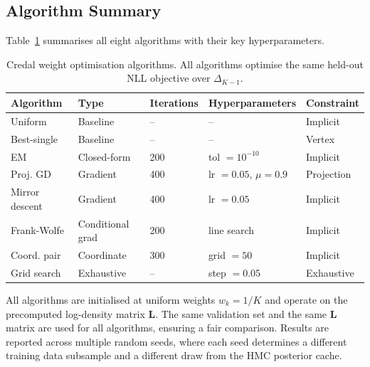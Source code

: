 \subsection{Algorithm Summary}

Table~\ref{tab:weight_algorithms} 
summarises all eight algorithms with 
their key hyperparameters.

\begin{table}[h]
\centering
\caption{Credal weight optimisation 
algorithms. All algorithms optimise 
the same held-out NLL objective over 
$\Delta_{K-1}$.}
\label{tab:weight_algorithms}
{\singlespacing
\begin{tabular}{lllll}
\hline
Algorithm & Type & Iterations 
& Hyperparameters & Constraint \\
\hline
Uniform & Baseline & -- 
& -- & Implicit \\
Best-single & Baseline & -- 
& -- & Vertex \\
EM & Closed-form & 200 
& tol $= 10^{-10}$ & Implicit \\
Proj. GD & Gradient & 400 
& lr $= 0.05$, $\mu = 0.9$ 
& Projection \\
Mirror descent & Gradient & 400 
& lr $= 0.05$ & Implicit \\
Frank-Wolfe & Conditional grad & 200 
& line search & Implicit \\
Coord. pair & Coordinate & 300 
& grid $= 50$ & Implicit \\
Grid search & Exhaustive & -- 
& step $= 0.05$ & Exhaustive \\
\hline
\end{tabular}}
\end{table}

All algorithms are initialised at 
uniform weights $w_k = 1/K$ and operate 
on the precomputed log-density matrix 
$\mathbf{L}$. The same validation set 
and the same $\mathbf{L}$ matrix are 
used for all algorithms, ensuring a 
fair comparison. Results are reported 
across multiple random seeds, where 
each seed determines a different 
training data subsample and a different 
draw from the HMC posterior cache.
